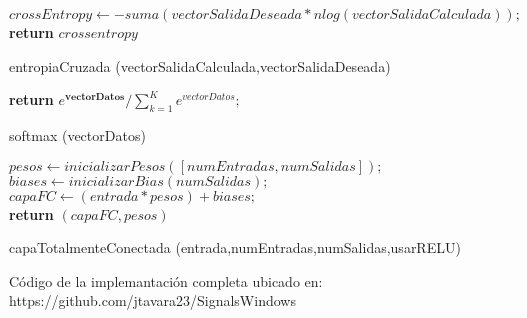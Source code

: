 \vskip 0.7cm
\begin{procedure}[H]
	\BlankLine
	$crossEntropy\gets -suma(vectorSalidaDeseada * nlog(vectorSalidaCalculada));$\\
	\textbf{return} $crossentropy$
	\caption{entropiaCruzada (vectorSalidaCalculada,vectorSalidaDeseada)}
\end{procedure}


\vskip 0.7cm
\begin{procedure}[H]
	\BlankLine
	\textbf{return} ${e^{\mathbf {vectorDatos}}} / {\sum _{k=1}^{K}e^{vectorDatos}};$
	\caption{softmax (vectorDatos)}
\end{procedure}



\begin{procedure}[H]
	\BlankLine
	$pesos\gets inicializarPesos([numEntradas, numSalidas]);$\\
	$biases\gets inicializarBias(numSalidas);$\\
	$capaFC\gets (entrada * pesos) + biases;$\\


	\textbf{return} $(capaFC, pesos)$
	\caption{capaTotalmenteConectada (entrada,numEntradas,numSalidas,usarRELU)}
\end{procedure}

Código de la implemantación completa ubicado en: https://github.com/jtavara23/SignalsWindows